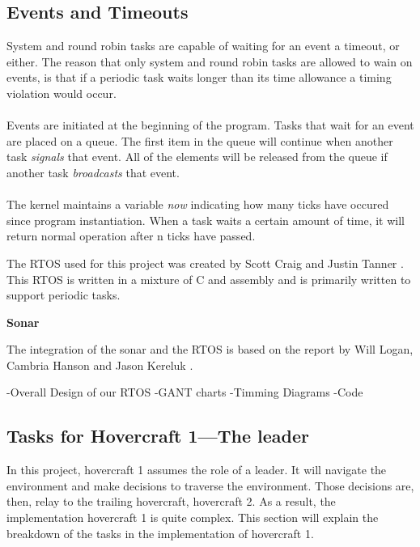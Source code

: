 \subsection{Events and Timeouts}

System and round robin tasks are capable of waiting for an event a timeout, or
either. The reason that only system and round robin tasks are allowed to wain on events, is that if a periodic task waits longer than its time allowance a timing violation would occur. \\

\\
Events are initiated at the beginning of the program. Tasks that wait for an event are placed on a queue. The first item in the queue will continue when another task \textit{signals} that event. All of the elements will be released from the queue if another task \textit{broadcasts} that event. \\

\\
The kernel maintains a variable \textit{now} indicating how many ticks have occured since program instantiation. When a task waits a certain amount of time, it will return normal operation after n ticks have passed.





The RTOS used for this project was created by Scott Craig and Justin Tanner \cite{RTOSSJ}. This RTOS is written in a mixture of C and assembly and is primarily written to support periodic tasks.   




\noindent\textbf{Sonar}

The integration of the sonar and the RTOS is based on the report by Will
Logan, Cambria Hanson and Jason Kereluk \cite{autoB}.

-Overall Design of our RTOS
-GANT charts
-Timming Diagrams
-Code

\subsection{Tasks for Hovercraft 1---The leader}
In this project, hovercraft 1 assumes the role of a leader. It will navigate the
environment and make decisions to traverse the environment. Those decisions are,
then, relay to the trailing hovercraft, hovercraft 2. As a result, the
implementation hovercraft 1 is quite complex. This section will explain the
breakdown of the tasks in the implementation of hovercraft 1.

